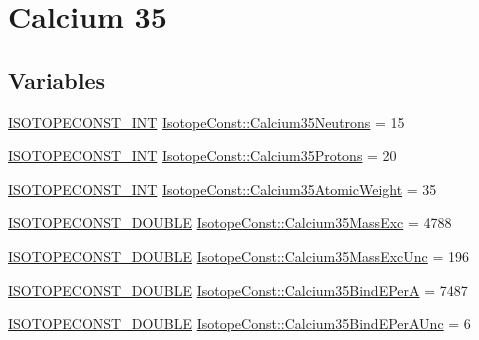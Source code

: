 \hypertarget{group___isotope_const-_calcium-_ca35}{}\section{Calcium 35}
\label{group___isotope_const-_calcium-_ca35}
\subsection*{Variables}
\begin{DoxyCompactItemize}
\item 
\mbox{\hyperlink{group___isotope_const-_macros_ga5f18360b3e99483a35c32d789e62621c}{I\+S\+O\+T\+O\+P\+E\+C\+O\+N\+S\+T\+\_\+\+I\+NT}} \mbox{\hyperlink{group___isotope_const-_calcium-_ca35_gabffbefd63b1c4713d1fe8a0bc888c1e0}{Isotope\+Const\+::\+Calcium35\+Neutrons}} = 15
\item 
\mbox{\hyperlink{group___isotope_const-_macros_ga5f18360b3e99483a35c32d789e62621c}{I\+S\+O\+T\+O\+P\+E\+C\+O\+N\+S\+T\+\_\+\+I\+NT}} \mbox{\hyperlink{group___isotope_const-_calcium-_ca35_ga4015e280554fd5b15cbd60ff30bd893c}{Isotope\+Const\+::\+Calcium35\+Protons}} = 20
\item 
\mbox{\hyperlink{group___isotope_const-_macros_ga5f18360b3e99483a35c32d789e62621c}{I\+S\+O\+T\+O\+P\+E\+C\+O\+N\+S\+T\+\_\+\+I\+NT}} \mbox{\hyperlink{group___isotope_const-_calcium-_ca35_ga54c74613138241420d7d1019b0ac0fd9}{Isotope\+Const\+::\+Calcium35\+Atomic\+Weight}} = 35
\item 
\mbox{\hyperlink{group___isotope_const-_macros_ga8f45a7272ce02c0b4c65c44636ed719a}{I\+S\+O\+T\+O\+P\+E\+C\+O\+N\+S\+T\+\_\+\+D\+O\+U\+B\+LE}} \mbox{\hyperlink{group___isotope_const-_calcium-_ca35_gac5df6c354a7b6b8632da139f4c276250}{Isotope\+Const\+::\+Calcium35\+Mass\+Exc}} = 4788
\item 
\mbox{\hyperlink{group___isotope_const-_macros_ga8f45a7272ce02c0b4c65c44636ed719a}{I\+S\+O\+T\+O\+P\+E\+C\+O\+N\+S\+T\+\_\+\+D\+O\+U\+B\+LE}} \mbox{\hyperlink{group___isotope_const-_calcium-_ca35_ga3776ffc4043baf45c42ef740dc04b41f}{Isotope\+Const\+::\+Calcium35\+Mass\+Exc\+Unc}} = 196
\item 
\mbox{\hyperlink{group___isotope_const-_macros_ga8f45a7272ce02c0b4c65c44636ed719a}{I\+S\+O\+T\+O\+P\+E\+C\+O\+N\+S\+T\+\_\+\+D\+O\+U\+B\+LE}} \mbox{\hyperlink{group___isotope_const-_calcium-_ca35_gaee9e5ae343604bbd99e03436406f796d}{Isotope\+Const\+::\+Calcium35\+Bind\+E\+PerA}} = 7487
\item 
\mbox{\hyperlink{group___isotope_const-_macros_ga8f45a7272ce02c0b4c65c44636ed719a}{I\+S\+O\+T\+O\+P\+E\+C\+O\+N\+S\+T\+\_\+\+D\+O\+U\+B\+LE}} \mbox{\hyperlink{group___isotope_const-_calcium-_ca35_gadc2d0fb752a93f21ef88851d6a6a54b4}{Isotope\+Const\+::\+Calcium35\+Bind\+E\+Per\+A\+Unc}} = 6

\end{DoxyCompactItemize}
